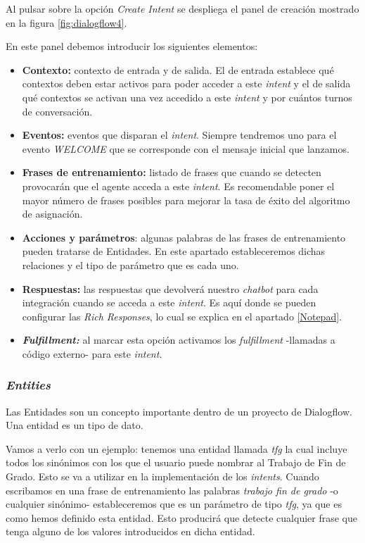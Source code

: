 Al pulsar sobre la opción \textit{Create Intent} se despliega el panel de creación mostrado en la figura \ref{fig:dialogflow4}.

\newpage
En este panel debemos introducir los siguientes elementos:
\begin{itemize}
	\tightlist
	\item 
	\textbf{Contexto:} contexto de entrada y de salida. El de entrada establece qué contextos deben estar activos para poder acceder a este \textit{intent} y el de salida qué contextos se activan una vez accedido a este \textit{intent} y por cuántos turnos de conversación.
	\item
	\textbf{Eventos:} eventos que disparan el \textit{intent}. Siempre tendremos uno para el evento \textit{WELCOME} que se corresponde con el mensaje inicial que lanzamos.
	\item
	\textbf{Frases de entrenamiento:} listado de frases que cuando se detecten provocarán que el agente acceda a este \textit{intent}. Es recomendable poner el mayor número de frases posibles para mejorar la tasa de éxito del algoritmo de asignación.
	\item
	\textbf{Acciones y parámetros}: algunas palabras de las frases de entrenamiento pueden tratarse de Entidades. En este apartado estableceremos dichas relaciones y el tipo de parámetro que es cada uno.
	\item
	\textbf{Respuestas:} las respuestas que devolverá nuestro \textit{chatbot} para cada integración cuando se acceda a este \textit{intent}. Es aquí donde se pueden configurar las \textit{Rich Responses}, lo cual se explica en el apartado \ref{Notepad}.
	\item
	\textbf{\textit{Fulfillment:}} al marcar esta opción activamos los \textit{fulfillment} -llamadas a código externo- para este \textit{intent}.
\end{itemize}

\subsubsection{\textit{Entities}}

Las Entidades son un concepto importante dentro de un proyecto de Dialogflow. Una entidad es un tipo de dato.  

Vamos a verlo con un ejemplo: tenemos una entidad llamada \textit{tfg} la cual incluye todos los sinónimos con los que el usuario puede nombrar al Trabajo de Fin de Grado. Esto se va a utilizar en la implementación de los \textit{intents}. Cuando escribamos en una frase de entrenamiento las palabras \textit{trabajo fin de grado} -o cualquier sinónimo- estableceremos que es un parámetro de tipo \textit{tfg}, ya que es como hemos definido esta entidad. Esto producirá que detecte cualquier frase que tenga alguno de los valores introducidos en dicha entidad.  

